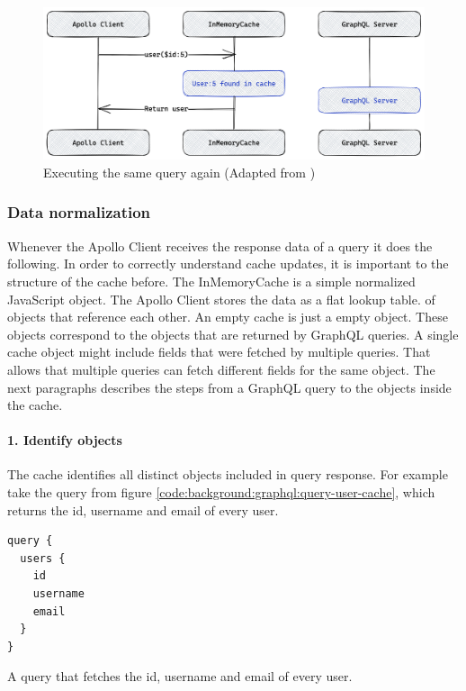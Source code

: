 \ifshowImages
\begin{figure}[H]
    \centering
    \includegraphics[width=0.7\linewidth]{images/background/apollo/apollo-client-basic-cache-warm.png}
    \caption{Executing the same query again (Adapted from \cite{misc:-:background:graphql:apollo-client-cache-overview})}\label{fig:background:graphql:user-query-second-time}
\end{figure}
\fi

\subsubsection{Data normalization}

Whenever the Apollo Client receives the response data of a query it does the following. In order to correctly understand cache updates, it is important to the structure of the cache before. The InMemoryCache is a simple normalized JavaScript object. The Apollo Client stores the data as a flat lookup table. of objects that reference each other. An empty cache is just a empty object. These objects correspond to the objects that are returned by GraphQL queries. A single cache object might include fields that were fetched by multiple queries. That allows that multiple queries can fetch different fields for the same object. \cite{misc:-:background:graphql:apollo-client-cache-overview} The next paragraphs describes the steps from a GraphQL query to the objects inside the cache.

\paragraph{1. Identify objects}

The cache identifies all distinct objects included in query response. For example take the query from figure \ref{code:background:graphql:query-user-cache}, which returns the id, username and email of every user.

\ifshowListings
\begin{listing}[H]
    \begin{verbatim}
query {
  users {
    id
    username
    email
  }
}
    \end{verbatim}
    \caption{A query that fetches the id, username and email of every user.}\label{code:background:graphql:query-user-cache}
\end{listing}
\fi

